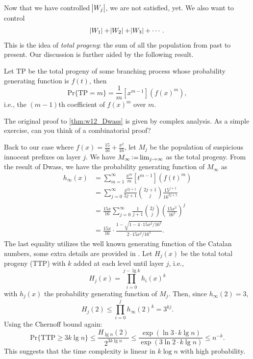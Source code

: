 Now that we have controlled $\abs{W_j}$, we are not satisfied, yet. We also want to control
\begin{equation*}
    \abs{W_1} + \abs{W_2} + \abs{W_3} + \cdots.
\end{equation*}
This is the idea of \textit{total progeny}: the sum of all the population from past to present. Our discussion is further aided by the following result.
\begin{theorem}[Dwass] \label{thm:w12_Dwass}
    Let $\mathrm{TP}$ be the total progeny of some branching process whose probability generating function is $f(t)$, then
    \begin{equation}
        \mathrm{Pr}\{\mathrm{TP} = m\} = \frac{1}{m} [x^{m-1}]\left(f(x)^m\right),
    \end{equation}
    i.e., the $(m-1)$th coefficient of $f(x)^m$ over $m$.
\end{theorem}

\begin{remark}
    The original proof to \autoref{thm:w12_Dwass} is given by complex analysis. As a simple exercise, can you think of a combinatorial proof?
\end{remark}

Back to our case where $f(x) = \frac{15}{16} + \frac{x^2}{16}$, let $M_j$ be the population of suspicious innocent prefixes on layer $j$. We have $M_\infty \operatorname{\vcentcolon=} \lim_{j\rightarrow\infty}$ as the total progeny. From the result of Dwass, we have the probability generating function of $M_\infty$ as
\begin{align*}
    h_\infty(x) &= \sum_{m=1}^{\infty} \frac{x^m}{m} [t^{m-1}]\left(f(t)^m\right) \\
    &= \sum_{j=0}^{\infty} \frac{x^{2j+1}}{2j+1} \binom{2j+1}{j} \frac{15^{j+1}}{16^{2j+1}} \\
    &= \frac{15x}{16} \sum_{j=0}^{\infty} \frac{1}{j+1}\binom{2j}{j} \left(\frac{15x^2}{16^2}\right)^j \\
    &= \frac{15x}{16} \cdot \frac{1-\sqrt{1-4\cdot15x^2/16^2}}{2\cdot15x^2/16^2}.
\end{align*}
The last equality utilizes the well known generating function of the Catalan numbers, some extra details are provided in . Let $H_j(x)$ be the total total progeny ($\mathrm{TTP}$) with $k$ added at each level until layer $j$, i.e.,
\begin{equation}
    H_j(x) = \prod_{i=0}^{j-\lg k} h_i(x)^k
\end{equation}
with $h_j(x)$ the probability generating function of $M_j$. Then, since $h_\infty(2)=3$,
\begin{equation*}
    H_j(2) \le \prod_{i=0}^{j} h_\infty(2)^k = 3^{kj}.
\end{equation*}
Using the Chernoff bound again:
\begin{equation}
    \mathrm{Pr}\{\mathrm{TTP} \ge 3k\lg n\} \le \frac{H_{\lg n}(2)}{2^{3k\lg n}} \le \frac{\exp(\ln3\cdot k\lg n)}{\exp(3\ln2\cdot k\lg n)} \le n^{-k}.
\end{equation}
This suggests that the time complexity is linear in $k\log n$ with high probability.